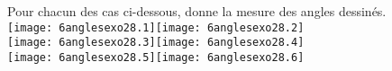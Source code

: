 Pour chacun des cas ci-dessous, donne la mesure des angles dessinés.
\\
\texttt{[image: 6anglesexo28.1]}\hfill\texttt{[image: 6anglesexo28.2]}
\\
\texttt{[image: 6anglesexo28.3]}\hfill\texttt{[image: 6anglesexo28.4]}
\\
\texttt{[image: 6anglesexo28.5]}\hfill\texttt{[image: 6anglesexo28.6]}
